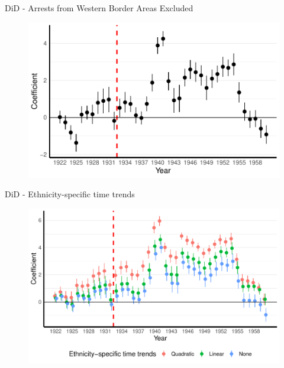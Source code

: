 \documentclass[11pt]{beamer}
\begin{document}
\begin{frame}[label=did_non_border_area_west]{DiD - Arrests from Western Border Areas Excluded}
 \begin{figure}[h]
\centering
\includegraphics[width=1\textwidth]{point_range_robust_cr2_non_border_provinces_western.pdf}
\end{figure}
\hyperlink{add_content}{}
\end{frame}


\begin{frame}[label=did_time_trends]{DiD - Ethnicity-specific time trends}
 \begin{figure}[h]
\centering
\includegraphics[width=1\textwidth]{trends_comp_pred_full_imp_date_cr2.pdf}
\end{figure}
\hyperlink{robustness_checks}{}
\end{frame}
\end{document}
